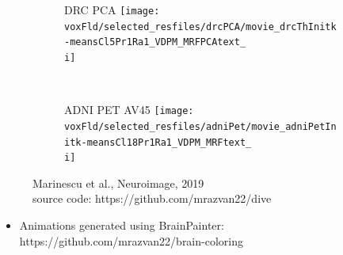 \documentclass[8pt,xcolor=table]{beamer}
\begin{document}
\begin{frame}
\begin{figure}[h]
\begin{animateinline}{\speed}
{{  \begin{subfigure}[b]{0.25 \textwidth}
   \centering
   \Large{DRC PCA}
    \texttt{[image: \\voxFld/selected\_resfiles/drcPCA/movie\_drcThInitk-meansCl5Pr1Ra1\_VDPM\_MRFPCAtext\_\\i]} 
  \end{subfigure}
  ~
  \begin{subfigure}[b]{0.25 \textwidth}
   \centering
   \Large{ADNI PET AV45}
   \texttt{[image: \\voxFld/selected\_resfiles/adniPet/movie\_adniPetInitk-meansCl18Pr1Ra1\_VDPM\_MRFtext\_\\i]} 
  \end{subfigure}
  
  }  
  }
  \end{animateinline}

  
  \small{Marinescu et al., Neuroimage, 2019}\\
  \small{source code: https://github.com/mrazvan22/dive}

\end{figure}

\begin{itemize}
 \item Animations generated using BrainPainter: https://github.com/mrazvan22/brain-coloring
\end{itemize}

\end{frame}





\newcommand{\outFoldADNICVbrains}{figures_ipmi_paper/crossvalid/adniThavgFWHM0Initk-meansCl3Pr0Ra1_VWDPMMean}
\newcommand{\scaleFig}{0.16}
\end{document}
